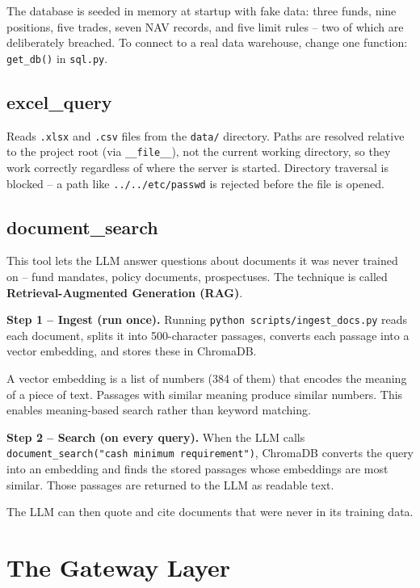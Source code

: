 \documentclass[12pt,a4paper]{article}
\begin{document}
The database is seeded in memory at startup with fake data: three funds, nine positions, five trades, seven NAV records, and five limit rules -- two of which are deliberately breached. To connect to a real data warehouse, change one function: \texttt{get\_db()} in \texttt{sql.py}.

\subsection{excel\_query}

Reads \texttt{.xlsx} and \texttt{.csv} files from the \texttt{data/} directory. Paths are resolved relative to the project root (via \texttt{\_\_file\_\_}), not the current working directory, so they work correctly regardless of where the server is started. Directory traversal is blocked -- a path like \texttt{../../etc/passwd} is rejected before the file is opened.

\subsection{document\_search}

This tool lets the LLM answer questions about documents it was never trained on -- fund mandates, policy documents, prospectuses. The technique is called \textbf{Retrieval-Augmented Generation (RAG)}.

\textbf{Step 1 -- Ingest (run once).} Running \texttt{python scripts/ingest\_docs.py} reads each document, splits it into 500-character passages, converts each passage into a vector embedding, and stores these in ChromaDB.

A vector embedding is a list of numbers (384 of them) that encodes the meaning of a piece of text. Passages with similar meaning produce similar numbers. This enables meaning-based search rather than keyword matching.

\textbf{Step 2 -- Search (on every query).} When the LLM calls \texttt{document\_search("cash minimum requirement")}, ChromaDB converts the query into an embedding and finds the stored passages whose embeddings are most similar. Those passages are returned to the LLM as readable text.

The LLM can then quote and cite documents that were never in its training data.


\section{The Gateway Layer}
\end{document}
